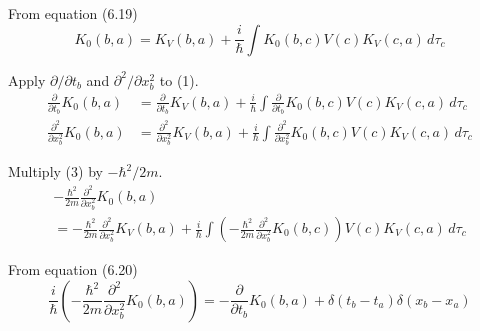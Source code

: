 


\bigskip
From equation (6.19)
\begin{equation*}
K_0(b,a)=K_V(b,a)+\frac{i}{\hbar}
\int K_0(b,c)V(c)K_V(c,a)\,d\tau_c
\tag{1}
\end{equation*}

Apply $\partial/\partial t_b$ and $\partial^2/\partial x_b^2$ to (1).
\begin{align*}
\frac{\partial}{\partial t_b}K_0(b,a)
&=\frac{\partial}{\partial t_b}K_V(b,a)
+\frac{i}{\hbar}\int \frac{\partial}{\partial t_b}K_0(b,c)V(c)K_V(c,a)\,d\tau_c
\tag{2}
\\
\frac{\partial^2}{\partial x_b^2}K_0(b,a)
&=\frac{\partial^2}{\partial x_b^2}K_V(b,a)
+\frac{i}{\hbar}\int \frac{\partial^2}{\partial x_b^2}K_0(b,c)V(c)K_V(c,a)\,d\tau_c
\tag{3}
\end{align*}

Multiply (3) by $-\hbar^2/2m$.
\begin{multline*}
-\frac{\hbar^2}{2m}\frac{\partial^2}{\partial x_b^2}K_0(b,a)
\\
{}=-\frac{\hbar^2}{2m}\frac{\partial^2}{\partial x_b^2}K_V(b,a)
+\frac{i}{\hbar}\int\left(-\frac{\hbar^2}{2m}\frac{\partial^2}{\partial x_b^2}K_0(b,c)\right)
V(c)K_V(c,a)\,d\tau_c
\tag{4}
\end{multline*}

From equation (6.20)
\begin{equation*}
\frac{i}{\hbar}\left(-\frac{\hbar^2}{2m}\frac{\partial^2}{\partial x_b^2}K_0(b,a)\right)
=
-\frac{\partial}{\partial t_b}K_0(b,a)
+\delta(t_b-t_a)\delta(x_b-x_a)
\end{equation*}

